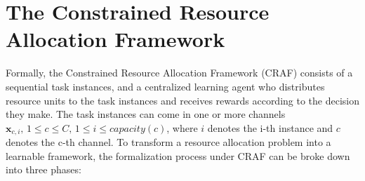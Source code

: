 \documentclass[conference]{IEEEtran}
\begin{document}
%
%
%
%
%


\section{The Constrained Resource Allocation Framework}

Formally, the Constrained Resource Allocation Framework (CRAF) consists of a sequential task instances, and a centralized learning agent who distributes resource units to the task instances and receives rewards according to the decision they make. The task instances can come in one or more channels $\mathbf{x}_{c,i},\, 1\leq c \leq C,\, 1\leq i \leq capacity(c)$, where $i$ denotes the i-th instance and $c$ denotes the c-th channel. To transform a resource allocation problem into a learnable framework, the formalization process under CRAF can be broke down into three phases:
\end{document}
